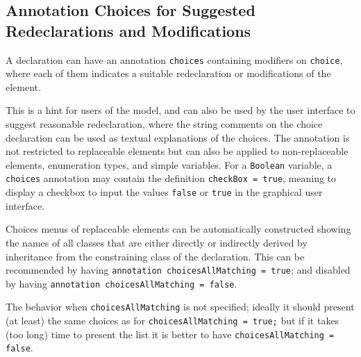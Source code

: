 \subsection{Annotation Choices for Suggested Redeclarations and Modifications}\label{annotation-choices-for-suggested-redeclarations-and-modifications}

A declaration can have an annotation \lstinline!choices! containing modifiers on
\lstinline!choice!, where each of them indicates a suitable redeclaration or
modifications of the element.

This is a hint for users of the model, and can also be used by the user interface to suggest reasonable redeclaration, where the string comments on the choice declaration can be used as textual explanations of the choices. The annotation is not restricted to replaceable elements but can also be applied to non-replaceable elements, enumeration types, and simple variables.  For a \lstinline!Boolean! variable, a \lstinline!choices! annotation may contain the definition \lstinline!checkBox = true!, meaning to display a checkbox to input the values \lstinline!false! or \lstinline!true! in the graphical user interface.

Choices menus of replaceable elements can be automatically constructed
showing the names of all classes that are either directly or indirectly
derived by inheritance from the constraining class of the declaration.
This can be recommended by having \lstinline!annotation choicesAllMatching = true!; and disabled by having
\lstinline!annotation choicesAllMatching = false!.
\begin{nonnormative}
The behavior when \lstinline!choicesAllMatching! is not specified; ideally it should present (at least) the same choices as for \lstinline!choicesAllMatching = true;! but if it takes (too long) time to present the list it is better to have \lstinline!choicesAllMatching = false!.
\end{nonnormative}

